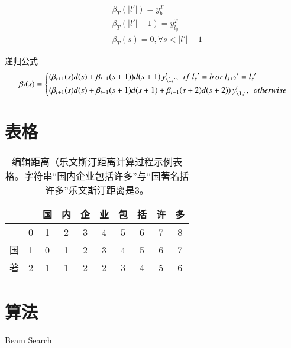\documentclass[winfonts]{njuthesis}
\begin{document}
		\begin{equation}
		\begin{aligned}
		&\beta_T(|l{}'|)=y_{b}^{T}\\
		&\beta_T(|l{}'|-1)=y_{l_|l|}^{T} \\
		&\beta_T(s)=0, \forall s < |l{}'|-1
		\end{aligned}
		\end{equation}
		
		递归公式
		\begin{equation}
		\beta_t(s)=\left\{
		\begin{aligned}
		& (\beta_{t+1}(s) d(s)+\beta_{t+1}(s+1))d(s+1)\,  y_{\l_s{}'}^t, \: \: if \:  l_s{}'=b \:  or \:  l_{s+2}{}'=l_s{}'\\
		& (\beta_{t+1}(s) d(s)+\beta_{t+1}(s+1)d(s+1)+\beta_{t+1}(s+2)d(s+2))\,  y_{\l_s{}'}^t,\: \:   otherwise
		\end{aligned}
		\right.
		\end{equation}

	\section{表格}
	
		\begin{table}[htbp]
		\setlength{\belowcaptionskip}{7pt}
		  \centering
		\begin{tabular}{|c|c|c|c|c|c|c|c|c|c|}
		\hline 
		  &   & 国 & 内 & 企 & 业 & 包 & 括 & 许 & 多 \\ 
		\hline 
		  & 0 & 1 & 2 & 3 & 4 & 5 & 6 & 7 & 8 \\ 
		\hline 
		国 & 1 & 0 & 1 & 2 & 3 & 4 & 5 & 6 & 7 \\ 
		\hline 
		著 & 2 & 1 & 1 & 2 & 2 & 3 & 4 & 5 & 6 \\ 
		\hline
		\end{tabular} 
		\vspace{0.2cm}
		  \caption{编辑距离（乐文斯汀距离计算过程示例表格。字符串``国内企业包括许多''与``国著名括许多''乐文斯汀距离是3。}\label{table:ld}
		\end{table}


	\section{算法}
	
	\begin{algorithm}
	\caption{Beam Search}
	\label{alg:beam}
	\begin{algorithmic}[1]
	\ELSE 
	\ENDIF
	\ENDWHILE
	\end{algorithmic}
	\end{algorithm}
	
\end{document}

